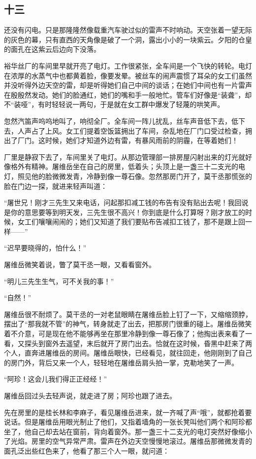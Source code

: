 \subsection*{十三}

\par 还没有闪电。只是那隆隆然像载重汽车驶过似的雷声不时响动。天空张着一望无际的灰色的幕，只有直西的天角像是破了一个洞，露出小小的一块紫云。夕阳的仓皇的面孔在这紫云后边向下没落。
\par 裕华丝厂的车间里早就开亮了电灯。工作很紧张，全车间是一个飞快的转轮。电灯在浓厚的水蒸气中也都黄着脸，像要发晕。被丝车的闹声震惯了耳朵的女工们虽然并没听得外边天空的雷，却是听得她们自己中间的谈话；在她们中间也有一片雷声在殷殷然发动。她们的脸通红，她们的嘴和手一般地忙。管车们好像是“装聋”，却不“装哑”，有时轻轻说一两句，于是就在女工群中爆发了轻蔑的哄笑声。
\par 忽然汽笛声呜呜地叫了，响彻全厂。全车间一阵儿扰乱，丝车声音低下去，低下去，人声占了上风。女工们提着空饭篮拥出了车间，杂乱地在厂门口受过检查，拥出了厂门。这时候，她们才知道外边有雷，有暴风雨前的阴霾，在等着她们！
\par 厂里是静寂下去了，车间里关了电灯。从那边管理部一排房屋闪射出来的灯光就好像格外有精神。屠维岳坐在自己的房里，低着头；头顶上是一盏三十二支光的电灯，照见他的脸微微发青，冷静到像一尊石像。忽然那房门开了，莫干丞那慌张的脸在门边一探，就进来轻声叫道：
\par “屠世兄！刚才三先生又来电话，问起那扣减工钱的布告有没有贴出去呢！我回说是你的意思要等到明天发，三先生很不高兴！你到底是什么打算呀？刚才放工的时候，女工们嚷嚷闹闹的；她们又知道了我们要贴布告减扣工钱了，那不是跟上回一样——”
\par “迟早要晓得的，怕什么！”
\par 屠维岳微笑着说，瞥了莫干丞一眼，又看看窗外。
\par “明儿三先生生气，可不关我的事！”
\par “自然！”
\par 屠维岳很不耐烦了。莫干丞的一对老鼠眼睛在屠维岳脸上钉了一下，又缩缩颈脖，摆出了“那我就不管”的神气，转身就走了出去，把那房门很重的碰上。屠维岳微笑着不介意，可是现在他不能够再坐在那里冷静到像一尊石像了；他掏出表来看了一看，又探头到窗外去遥望，末后就开了房门出去。恰就在这时候，昏黑中赶来了两个人，直奔进屠维岳的房间。屠维岳眼快，已经看见，就往回走，他刚刚到了自己的房门外，背后又来一个人，轻轻地在屠维岳肩头拍一掌，克勒地笑了一声。
\par “阿珍！这会儿我们得正正经经！”
\par 屠维岳回过头去轻声说，就走进了房；阿珍也跟了进去。
\par 先在房里的是桂长林和李麻子，看见屠维岳进来，就一齐喊了声“哦”，就都抢着要说话。但是屠维岳用眼光制止了他们，又指着墙角的一张长凳叫他们两个和阿珍都坐了，他自己却去站在窗前，背向着窗外。那一盏三十二支光的电灯突然好像缩小了光焰。房里的空气异常严肃。雷声在外边天空慢慢地滚过。屠维岳那微微发青的面孔泛出些红色来了，他看了那三个人一眼，就问道：
